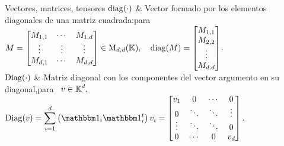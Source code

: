 \begin{notation}{Vectores, matrices, tensores}
\hline
%
$\operatorname{diag}(\cdot)$  & Vector  formado  por  los elementos  diagonales  de una  matriz
cuadrada:\vspace{1mm}\newline para
 \ $\displaystyle M = \protect\begin{bmatrix}
  M_{1,1}  & \cdots & M_{1,d} \\
  \vdots  & \vdots & \vdots \\
  M_{d,1} & \cdots & M_{d,d}
\end{bmatrix}\protect
\in \mathrm{M}_{d,d}(\mathbb{K}), \quad \operatorname{diag}(M) = \protect\begin{bmatrix} M_{1,1} \\
M_{2,2} \\ \vdots \\ M_{d,d}
\end{bmatrix}\protect$.\vspace{1mm}\\[2.5mm]
%
\hline
%
$\operatorname{Diag}(\cdot)$ & Matriz diagonal  con los componentes del vector argumento en su
diagonal,\vspace{1mm}\newline para \ $\displaystyle v \in \mathbb{K}^d,$\vspace{1mm}\newline
$\displaystyle \Diag(v) = \sum_{i=1}^d \left( \un_i \un_i^t \right) v_i =
\protect\begin{bmatrix}
  v_1  &   0    & \cdots &    0   \\[-.25mm]
   0   & \ddots & \ddots & \vdots \\[-1mm]
\vdots & \ddots & \ddots &    0   \\[-.25mm]
   0   & \cdots &    0   &   v_d
\end{bmatrix}\protect$.\vspace{1mm}\\[2.5mm]
%

\end{notation}
